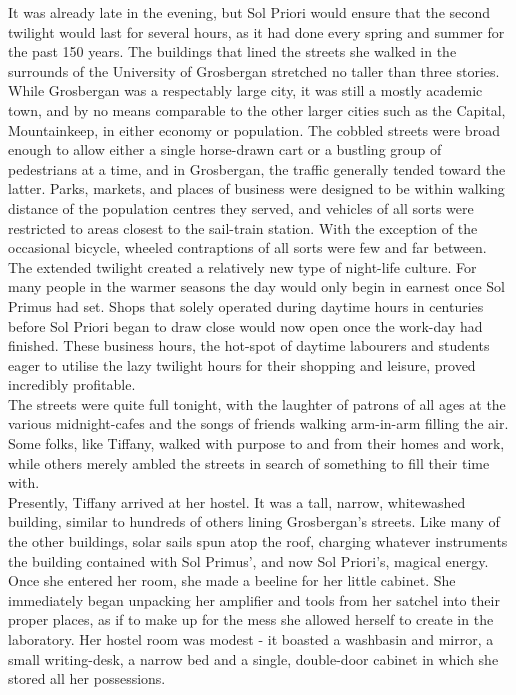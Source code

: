 It was already late in the evening, but Sol Priori would ensure that the second twilight would last for several hours, as it had done every spring and summer for the past 150 years.
The buildings that lined the streets she walked in the surrounds of the University of Grosbergan stretched no taller than three stories.
While Grosbergan was a respectably large city, it was still a mostly academic town, and by no means comparable to the other larger cities such as the Capital, Mountainkeep, in either economy or population.
The cobbled streets were broad enough to allow either a single horse-drawn cart or a bustling group of pedestrians at a time, and in Grosbergan, the traffic generally tended toward the latter.
Parks, markets, and places of business were designed to be within walking distance of the population centres they served, and vehicles of all sorts were restricted to areas closest to the sail-train station.
With the exception of the occasional bicycle, wheeled contraptions of all sorts were few and far between.\\

The extended twilight created a relatively new type of night-life culture. For many people in the warmer seasons the day would only begin in earnest once Sol Primus had set. Shops that solely operated during daytime hours in centuries before Sol Priori began to draw close would now open once the work-day had finished. These business hours, the hot-spot of daytime labourers and students eager to utilise the lazy twilight hours for their shopping and leisure, proved incredibly profitable.\\

The streets were quite full tonight, with the laughter of patrons of all ages at the various midnight-cafes and the songs of friends walking arm-in-arm filling the air.
Some folks, like Tiffany, walked with purpose to and from their homes and work, while others merely ambled the streets in search of something to fill their time with.\\

Presently, Tiffany arrived at her hostel. 
It was a tall, narrow, whitewashed building, similar to hundreds of others lining Grosbergan's streets.
Like many of the other buildings, solar sails spun atop the roof, charging whatever instruments the building contained with Sol Primus', and now Sol Priori's, magical energy.
Once she entered her room, she made a beeline for her little cabinet. She immediately began unpacking her amplifier and tools from her satchel into their proper places, as if to make up for the mess she allowed herself to create in the laboratory.
Her hostel room was modest - it boasted a washbasin and mirror, a small writing-desk, a narrow bed and a single, double-door cabinet in which she stored all her possessions.\\

